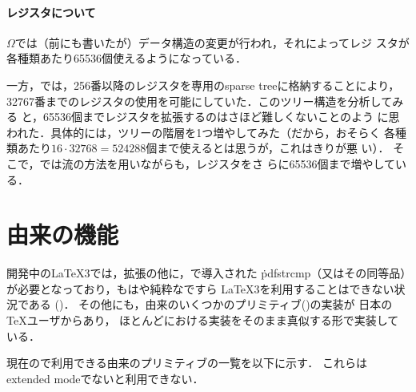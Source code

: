 \documentclass[a4paper,11pt,nomag]{jsarticle}
\newcommand{\OMEGA}{$\Omega$}
\begin{document}
\paragraph{レジスタについて}
\OMEGA では（前にも書いたが）データ構造の変更が行われ，それによってレジ
スタが各種類あたり65536個使えるようになっている．

一方，\eTeX では，256番以降のレジスタを専用のsparse treeに格納することにより，
32767番までのレジスタの使用を可能にしていた．このツリー構造を分析してみる
と，65536個までレジスタを拡張するのはさほど難しくないことのよう
に思われた．具体的には，ツリーの階層を1つ増やしてみた（だから，おそらく
各種類あたり$16\cdot 32768=524288$個まで使えるとは思うが，これはきりが悪
い）．
そこで，\epTeX では\eTeX 流の方法を用いながらも，レジスタをさ
らに65536個まで増やしている．

\section{由来の機能}
開発中の\LaTeX 3では，\eTeX 拡張の他に，で導入された
\.{pdfstrcmp}（又はその同等品）が必要となっており，もはや純粋な\eTeX ですら
\LaTeX 3を利用することはできない状況である (\cite{expl31,expl32,expl33})．
その他にも，由来のいくつかのプリミティブ(\cite{pdftexman})の実装が
日本の\TeX ユーザからあり，
ほとんどにおける実装をそのまま真似する形で実装している．

現在の\epTeX で利用できる由来のプリミティブの一覧を以下に示す．
これらはextended modeでないと利用できない．
\end{document}
